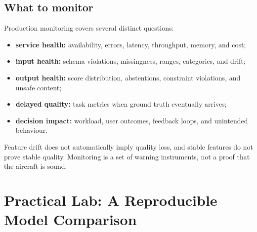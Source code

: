 \subsection{What to monitor}

Production monitoring covers several distinct questions:

\begin{itemize}
    \item \textbf{service health:} availability, errors, latency, throughput,
          memory, and cost;
    \item \textbf{input health:} schema violations, missingness, ranges,
          categories, and drift;
    \item \textbf{output health:} score distribution, abstentions, constraint
          violations, and unsafe content;
    \item \textbf{delayed quality:} task metrics when ground truth eventually
          arrives;
    \item \textbf{decision impact:} workload, user outcomes, feedback loops,
          and unintended behaviour.
\end{itemize}

Feature drift does not automatically imply quality loss, and stable features
do not prove stable quality.
Monitoring is a set of warning instruments, not a proof that the aircraft is
sound.

\section{Practical Lab: A Reproducible Model Comparison}

